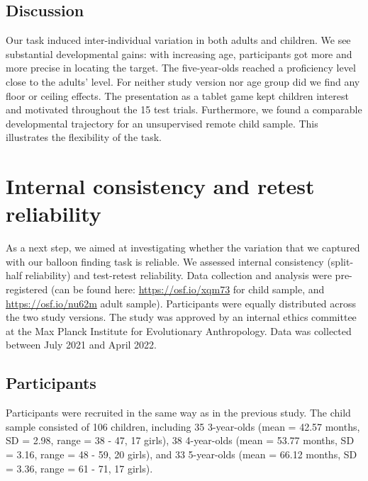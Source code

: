 \documentclass[
  man,floatsintext]{apa6}
\begin{document}
\hypertarget{discussion}{%
\subsection{Discussion}\label{discussion}}

Our task induced inter-individual variation in both adults and children. We see substantial developmental gains: with increasing age, participants got more and more precise in locating the target. The five-year-olds reached a proficiency level close to the adults' level. For neither study version nor age group did we find any floor or ceiling effects. The presentation as a tablet game kept children interest and motivated throughout the 15 test trials. Furthermore, we found a comparable developmental trajectory for an unsupervised remote child sample. This illustrates the flexibility of the task.

\hypertarget{internal-consistency-and-retest-reliability}{%
\section{Internal consistency and retest reliability}\label{internal-consistency-and-retest-reliability}}

As a next step, we aimed at investigating whether the variation that we captured with our balloon finding task is reliable. We assessed internal consistency (split-half reliability) and test-retest reliability. Data collection and analysis were pre-registered (can be found here: \url{https://osf.io/xqm73} for child sample, and \url{https://osf.io/nu62m} adult sample). Participants were equally distributed across the two study versions. The study was approved by an internal ethics committee at the Max Planck Institute for Evolutionary Anthropology. Data was collected between July 2021 and April 2022.

\hypertarget{participants-1}{%
\subsection{Participants}\label{participants-1}}

Participants were recruited in the same way as in the previous study. The child sample consisted of
106 children, including
35 3-year-olds
(mean = 42.57 months,
SD = 2.98,
range = 38
- 47,
17 girls),
38 4-year-olds
(mean = 53.77 months,
SD = 3.16,
range = 48
- 59,
20 girls),
and 33 5-year-olds
(mean = 66.12 months,
SD = 3.36,
range = 61
- 71,
17 girls).
\end{document}
